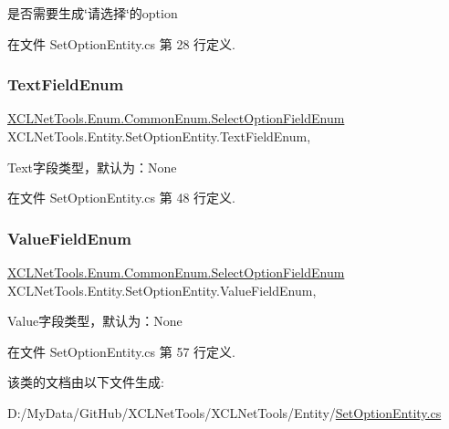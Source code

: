 是否需要生成\char`\"{}请选择\char`\"{}的option 



在文件 Set\+Option\+Entity.\+cs 第 28 行定义.

\mbox{\label{class_x_c_l_net_tools_1_1_entity_1_1_set_option_entity_a73ab171debc846e282a87565cf7baf96}} 
\subsubsection{\texorpdfstring{Text\+Field\+Enum}{TextFieldEnum}}
{\footnotesize\ttfamily \hyperlink{class_x_c_l_net_tools_1_1_enum_1_1_common_enum_afe1323cff3b78e93907bf636697b2b59}{X\+C\+L\+Net\+Tools.\+Enum.\+Common\+Enum.\+Select\+Option\+Field\+Enum} X\+C\+L\+Net\+Tools.\+Entity.\+Set\+Option\+Entity.\+Text\+Field\+Enum\hspace{0.3cm}{\ttfamily [get]}, {\ttfamily [set]}}



Text字段类型，默认为：\+None 



在文件 Set\+Option\+Entity.\+cs 第 48 行定义.

\mbox{\label{class_x_c_l_net_tools_1_1_entity_1_1_set_option_entity_a3f5eebe69ef0bc0e2c184f9d8d65fbaf}} 
\subsubsection{\texorpdfstring{Value\+Field\+Enum}{ValueFieldEnum}}
{\footnotesize\ttfamily \hyperlink{class_x_c_l_net_tools_1_1_enum_1_1_common_enum_afe1323cff3b78e93907bf636697b2b59}{X\+C\+L\+Net\+Tools.\+Enum.\+Common\+Enum.\+Select\+Option\+Field\+Enum} X\+C\+L\+Net\+Tools.\+Entity.\+Set\+Option\+Entity.\+Value\+Field\+Enum\hspace{0.3cm}{\ttfamily [get]}, {\ttfamily [set]}}



Value字段类型，默认为：\+None 



在文件 Set\+Option\+Entity.\+cs 第 57 行定义.



该类的文档由以下文件生成\+:\begin{DoxyCompactItemize}
\item 
D\+:/\+My\+Data/\+Git\+Hub/\+X\+C\+L\+Net\+Tools/\+X\+C\+L\+Net\+Tools/\+Entity/\hyperlink{_set_option_entity_8cs}{Set\+Option\+Entity.\+cs}\end{DoxyCompactItemize}
